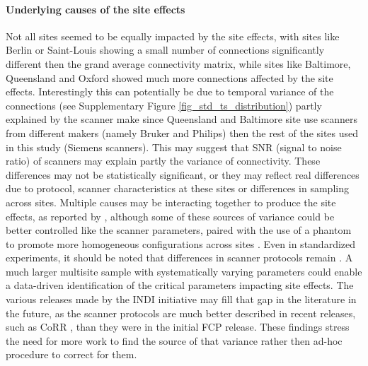 \documentclass[authoryear]{elsarticle}
\begin{document}
\paragraph{Underlying causes of the site effects}
Not all sites seemed to be equally impacted by the site effects, with sites like Berlin or Saint-Louis showing a small number of connections significantly different then the grand average connectivity matrix, while sites like Baltimore, Queensland and Oxford showed much more connections affected by the site effects. Interestingly this can potentially be due to temporal variance of the connections (see Supplementary Figure \ref{fig_std_ts_distribution}) partly explained by the scanner make since Queensland and Baltimore site use scanners from different makers (namely Bruker and Philips) then the rest of the sites used in this study (Siemens scanners). This may suggest that SNR (signal to noise ratio) of scanners may explain partly the variance of connectivity. These differences may not be statistically significant, or they may reflect real differences due to protocol, scanner characteristics at these sites or differences in sampling across sites. Multiple causes may be interacting together to produce the site effects, as reported by \cite{Yan2013a}, although some of these sources of variance could be better controlled like the scanner parameters, paired with the use of a phantom to promote more homogeneous configurations across sites \citep{Friedman2006,Friedman2006a,Glover2012,Friedman2008}. Even in standardized experiments, it should be noted that differences in scanner protocols remain \citep{Brown2011}. A much larger multisite sample with systematically varying parameters could enable a data-driven identification of the critical parameters impacting site effects. The various releases made by the INDI initiative may fill that gap in the literature in the future, as the scanner protocols are much better described in recent releases, such as CoRR \citep{Zuo2014-ec}, than they were in the initial FCP release. These findings stress the need for more work to find the source of that variance rather then ad-hoc procedure to correct for them.
\end{document}
